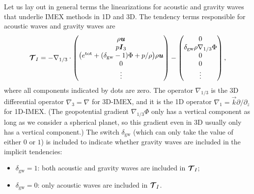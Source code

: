 \documentclass{report}
\begin{document}
Let us lay out in general terms the linearizations for acoustic and gravity waves that underlie IMEX methods in 1D and 3D. The tendency terms responsible for acoustic waves and gravity waves are
 \begin{equation}
 \boldsymbol{{\mathcal{T}}}_{I}= -\nabla_{1/3} \cdot
 \begin{pmatrix}
 \rho \boldsymbol{{u}} \\
 p \boldsymbol{{I}}_3 \\
 \bigl(e^{\mathrm{tot}} + (\delta_{\mathrm{gw}}-1) \Phi + p/\rho \bigr) \rho \boldsymbol{{u}} \\
 0\\
 \vdots
 \end{pmatrix}
 - \begin{pmatrix}
 0 \\
 \delta_{\mathrm{gw}} \rho \nabla_{1/3} \Phi \\
 0\\
 0\\
 \vdots
 \end{pmatrix},
 \label{eq:3d-imex/tendencies}
 \end{equation}
where all components indicated by dots are zero. The operator $\nabla_{1/3}$ is the 3D differential operator $\nabla_3 = \nabla$ for 3D-IMEX, and it is the 1D operator $\nabla_1 = \vec{k} \partial/\partial_z$ for 1D-IMEX. (The geopotential gradient $\nabla_{1/3} \Phi$ only has a vertical component as long as we consider a spherical planet, so this gradient even in 3D usually only has a vertical component.) The switch $\delta_{\mathrm{gw}}$ (which can only take the value of either $0$ or $1$) is included to indicate whether gravity waves are included in the implicit tendencies: 
\begin{itemize}
    \item $\delta_{\mathrm{gw}}=1$: both acoustic and gravity waves are included in $\boldsymbol{{\mathcal{T}}}_I$;
    \item $\delta_{\mathrm{gw}}=0$: only acoustic waves are included in $\boldsymbol{{\mathcal{T}}}_I$.
\end{itemize}
\end{document}
